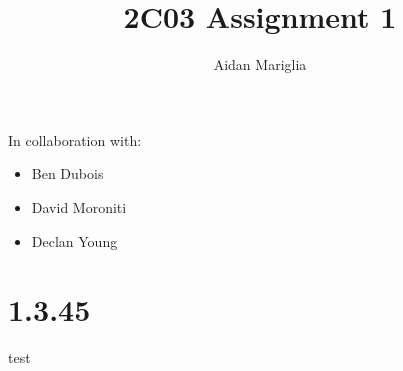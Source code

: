 \documentclass[12pt]{article}
\title{2C03 Assignment 1}
\author{Aidan Mariglia}
\begin{document}
\maketitle

In collaboration with:
\begin{itemize}[noitemsep]
  \item Ben Dubois
  \item David Moroniti
  \item Declan Young
\end{itemize}

\section{1.3.45}
  test
\end{document}
